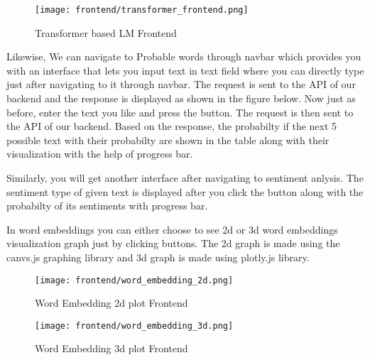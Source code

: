 \begin{figure}[H]
    \centering
    \texttt{[image: frontend/transformer\_frontend.png]}
    \caption{Transformer based LM Frontend}
    \label{fig: Transformer based LM Frontend}
\end{figure}

Likewise, We can navigate to Probable words through navbar which provides you with an interface that lets you input text in text field where you can directly type just after navigating to it through navbar.  The request is sent to the API of our backend and the response is displayed as shown in the figure below. Now just as before, enter the text you like and  press the button. The request is then sent to the API of our backend. Based on the response, the probabilty if the next 5 possible text with their probabilty are shown in the table along with their visualization with the help of progress bar.


Similarly, you will get another interface after navigating to sentiment anlysis. The sentiment type of given text is displayed after you click the button along with the probabilty of its sentiments with progress bar.


In word embeddings you can either choose to see 2d or 3d word embeddings visualization graph just by clicking buttons. The 2d graph is made using the canvs.js graphing library and 3d graph is made using plotly.js library.

\begin{figure}[H]
    \centering
    \texttt{[image: frontend/word\_embedding\_2d.png]}
    \caption{Word Embedding 2d plot Frontend}
    \label{fig: Word Embedding 2d plot Frontend}
\end{figure}

\begin{figure}[H]
    \centering
    \texttt{[image: frontend/word\_embedding\_3d.png]}
    \caption{Word Embedding 3d plot Frontend}
    \label{fig: Word Embedding 3d plot Frontend}
\end{figure}
